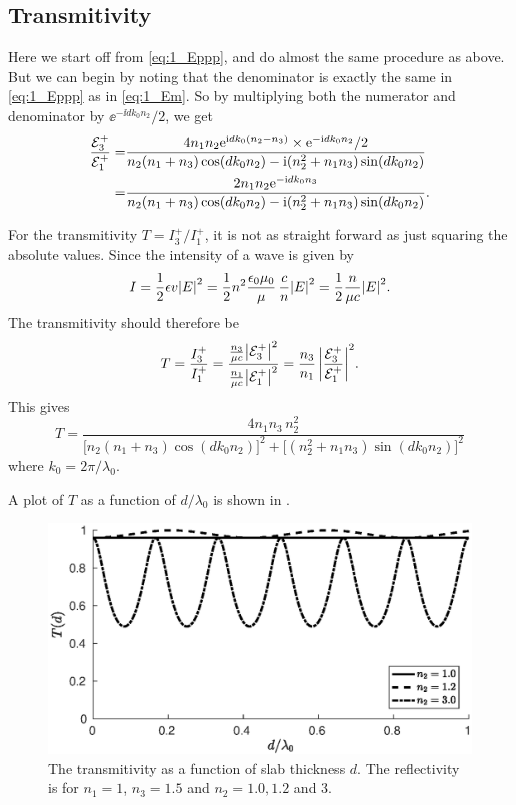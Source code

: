 \documentclass[11pt,letter, swedish, english
]{article}
\begin{document}
\subsection{Transmitivity}
Here we start off from \eqref{eq:1_Eppp}, and do almost the same
procedure as above. But we can begin by noting that the denominator is
exactly the same in \eqref{eq:1_Eppp} as in \eqref{eq:1_Em}. So by
multiplying both the numerator and denominator by $\ee^{-\ii dk_0n_2}/2$,
we get
\begin{equation}
\begin{aligned}
\frac{{\mathcal{E}_3^+}}{{\mathcal{E}_1^+}} =&
\frac{
4n_1n_2 \mathrm{e}^{\mathrm{i} d k_0(n_2-n_3)} \times \mathrm{e}^{-\mathrm{i} dk_0n_2}/2
}{n_2(n_1 +n_3)\cos(dk_0n_2) - \mathrm{i}(n_2^2 +n_1n_3)\sin(dk_0n_2) 
}\\
=&
\frac{
2n_1n_2 \mathrm{e}^{-\mathrm{i} d k_0n_3} 
}{n_2(n_1 +n_3)\cos(dk_0n_2) - \mathrm{i}(n_2^2 +n_1n_3)\sin(dk_0n_2) 
}.
\end{aligned}
\end{equation}

For the transmitivity $T=I_3^+/I_1^+$, it is not as straight forward
as just squaring the absolute values. Since the intensity of a wave is
given by
\begin{equation}
I = \frac{1}{2} \epsilon v \abs{E}^2 
= \frac{1}{2} n^2\frac{\epsilon_0\mu_0}{\mu} \,\frac{c}{n} \abs{E}^2 
= \frac{1}{2} \frac{n}{\mu c} \abs{E}^2. 
\end{equation}
The transmitivity should therefore be
\begin{equation}
T = \frac{I_3^+}{I_1^+} 
= \frac{\frac{n_3}{\mu c}\abs{{\mathcal{E}_3^+}}^2}{\frac{n_1}{\mu c}\abs{{\mathcal{E}_1^+}}^2}
= \frac{n_3}{n_1}\,\abs{\frac{{\mathcal{E}_3^+}}{{\mathcal{E}_1^+}}}^2.
\end{equation}
This gives
\begin{equation}
T =
\frac{
4n_1n_3\,n_2^2
}{
\Big[n_2(n_1 +n_3)\cos(dk_0n_2)\Big]^2 
+\Big[(n_2^2 +n_1n_3)\sin(dk_0n_2)\Big]^2 
}
\end{equation}
where $k_0=2\pi/\lambda_0$.

A plot of $T$ as a function of $d/\lambda_0$ is shown in
. 

\begin{figure}
\centering
\includegraphics[width=.9\textwidth]{1b_T.eps}
\caption{The transmitivity as a function of slab thickness $d$. The
  reflectivity is for $n_1=1$, $n_3=1.5$ and $n_2=1.0, 1.2$ and 3.}
\label{fig:1b_T}
\end{figure}
\end{document}
